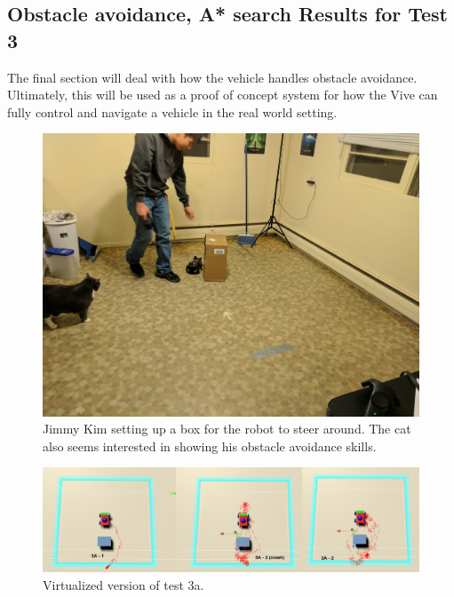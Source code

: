\documentclass[10pt,a4paper]{article}
\begin{document}
	\subsection*{Obstacle avoidance, A* search Results for Test 3}
	The final section will deal with how the vehicle handles obstacle avoidance. Ultimately, this will be used as a proof of concept system for how the Vive can fully control and navigate a vehicle in the real world setting.
	
	\begin{figure}
		\centering
		\includegraphics[width=.6\textwidth]{box_setup.jpg}
		\caption{Jimmy Kim setting up a box for the robot to steer around. The cat also seems interested in showing his obstacle avoidance skills.}
		\label{fig:photo_jimmy_box}
	\end{figure}
	
	\begin{figure}
		\centering
		\includegraphics[width=1\textwidth]{Test3_Visuals/Test3a_mosaic.png}
		\caption{Virtualized version of test 3a.}
		\label{fig:vis_comp_t3a}
	\end{figure}
\end{document}
